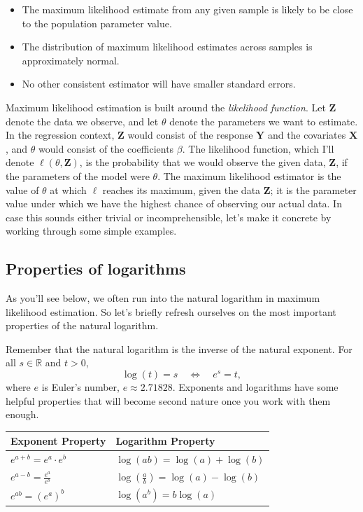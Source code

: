 \documentclass[
  12pt,
  oneside,openany]{book}
\begin{document}
\begin{itemize}
  \begin{itemize}
  \item
    The maximum likelihood estimate from any given sample is likely to be close to the population parameter value.
  \item
    The distribution of maximum likelihood estimates across samples is approximately normal.
  \item
    No other consistent estimator will have smaller standard errors.
  \end{itemize}
\end{itemize}

Maximum likelihood estimation is built around the \emph{likelihood function}.
Let \(\mathbf{Z}\) denote the data we observe, and let \(\theta\) denote the parameters we want to estimate.
In the regression context, \(\mathbf{Z}\) would consist of the response \(\mathbf{Y}\) and the covariates \(\mathbf{X}\), and \(\theta\) would consist of the coefficients \(\beta\).
The likelihood function, which I'll denote \(\ell(\theta, \mathbf{Z})\), is the probability that we would observe the given data, \(\mathbf{Z}\), if the parameters of the model were \(\theta\).
The maximum likelihood estimator is the value of \(\theta\) at which \(\ell\) reaches its maximum, given the data \(\mathbf{Z}\); it is the parameter value under which we have the highest chance of observing our actual data.
In case this sounds either trivial or incomprehensible, let's make it concrete by working through some simple examples.

\hypertarget{properties-of-logarithms}{%
\subsection{Properties of logarithms}\label{properties-of-logarithms}}

As you'll see below, we often run into the natural logarithm in maximum likelihood estimation.
So let's briefly refresh ourselves on the most important properties of the natural logarithm.

Remember that the natural logarithm is the inverse of the natural exponent.
For all \(s \in \mathbb{R}\) and \(t > 0\),
\[
\log (t) = s \quad \Leftrightarrow \quad e^s = t,
\]
where \(e\) is Euler's number, \(e \approx 2.71828\).
Exponents and logarithms have some helpful properties that will become second nature once you work with them enough.

\begin{longtable}[]{@{}ll@{}}
\toprule
Exponent Property & Logarithm Property\tabularnewline
\midrule
\endhead
\(e^{a + b} = e^a \cdot e^b\) & \(\log (ab) = \log(a) + \log(b)\)\tabularnewline
\(e^{a - b} = \frac{e^a}{e^b}\) & \(\log (\frac{a}{b}) = \log(a) - \log(b)\)\tabularnewline
\(e^{ab} = (e^a)^b\) & \(\log (a^b) = b \log (a)\)\tabularnewline
\bottomrule
\end{longtable}
\end{document}

